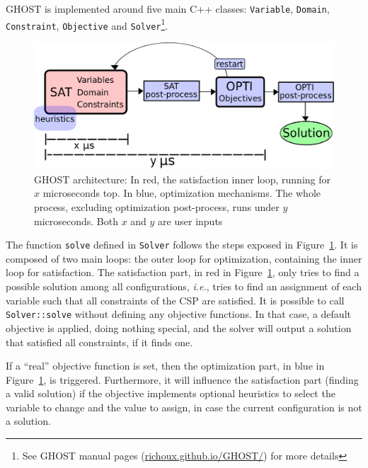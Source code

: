 \documentclass[journal]{IEEEtran}
\newcommand{\minormod}[1]{#1 \xspace}
\newcommand{\csp}{\textsc{CSP}\xspace}
\newcommand{\ghost}{\textsc{GHOST}\xspace}
\newcommand{\ie}{\textit{i.e.}}
\begin{document}
\ghost is implemented around five main C++ classes: \texttt{Variable},
\texttt{Domain},    \texttt{Constraint},     \texttt{Objective}    and
\texttt{Solver}\footnote{See        \ghost         manual        pages
  (\href{http://richoux.github.io/GHOST/}{richoux.github.io/GHOST/})
  for more  details}. %
\begin{figure}[th]
  \centering
  \includegraphics[width=\columnwidth]{figs/archi4.png}
  \caption{\ghost architecture:  In red, the satisfaction  inner loop,
    running  for   $x$  microseconds   top.   In   blue,  optimization
    mechanisms.    The    whole   process,    excluding   optimization
    post-process, runs under $y$ microseconds. \minormod{Both $x$ and $y$ are user inputs}}
  \label{fig:archi}
\end{figure}

The  function \texttt{solve}  defined in  \texttt{Solver} follows  the
steps exposed  in Figure~\ref{fig:archi}. It  is composed of  two main
loops: the outer loop for  optimization, containing the inner loop for
satisfaction.       The     satisfaction     part,    in     red     in
Figure~\ref{fig:archi}, only  tries to find a  possible solution among
all configurations, \ie, tries to  find an assignment of each variable
such that all constraints of the \csp are satisfied. It is possible to
call \texttt{Solver::solve} without  defining any objective functions.
In that case,  a default objective is applied,  doing nothing special,
and the solver will output  a solution that satisfied all constraints,
if it finds one.

If a ``real'' objective function  is set, then the optimization part,
in blue  in Figure~\ref{fig:archi}, is  triggered. Furthermore,  it will
influence  the satisfaction  part (finding  a valid  solution) if  the
objective  implements optional  heuristics to  select the  variable to
change and the value to assign,  in case the current configuration is not a
solution.
\end{document}
